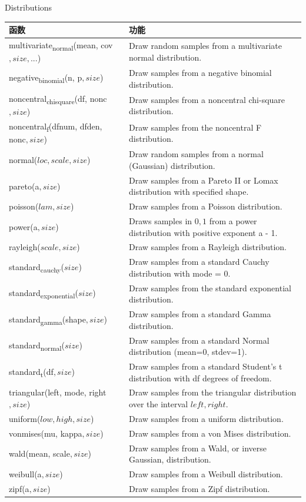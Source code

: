 \documentclass[ignorenonframetext,11pt,xcolor=dvipsnames,hyperref={colorlinks,allcolors=.,urlcolor=blue, citecolor=violet, bookmarksdepth=4},aspectratio=1610]{beamer}
\begin{document}
\begin{frame}{Distributions}
\protect\hypertarget{distributions}{}

\scriptsize

\begin{longtable}[]{@{}ll@{}}
\toprule
函数 & 功能\tabularnewline
\midrule
\endhead
multivariate\textsubscript{normal}(mean, cov\(, size, ...\)) & Draw
random samples from a multivariate normal distribution.\tabularnewline
negative\textsubscript{binomial}(n, p\(, size\)) & Draw samples from a
negative binomial distribution.\tabularnewline
noncentral\textsubscript{chisquare}(df, nonc\(, size\)) & Draw samples
from a noncentral chi-square distribution.\tabularnewline
noncentral\textsubscript{f}(dfnum, dfden, nonc\(, size\)) & Draw samples
from the noncentral F distribution.\tabularnewline
normal(\(loc, scale, size\)) & Draw random samples from a normal
(Gaussian) distribution.\tabularnewline
pareto(a\(, size\)) & Draw samples from a Pareto II or Lomax
distribution with specified shape.\tabularnewline
poisson(\(lam, size\)) & Draw samples from a Poisson
distribution.\tabularnewline
power(a\(, size\)) & Draws samples in \(0, 1\) from a power distribution
with positive exponent a - 1.\tabularnewline
rayleigh(\(scale, size\)) & Draw samples from a Rayleigh
distribution.\tabularnewline
standard\textsubscript{cauchy}(\(size\)) & Draw samples from a standard
Cauchy distribution with mode = 0.\tabularnewline
standard\textsubscript{exponential}(\(size\)) & Draw samples from the
standard exponential distribution.\tabularnewline
standard\textsubscript{gamma}(shape\(, size\)) & Draw samples from a
standard Gamma distribution.\tabularnewline
standard\textsubscript{normal}(\(size\)) & Draw samples from a standard
Normal distribution (mean=0, stdev=1).\tabularnewline
standard\textsubscript{t}(df\(, size\)) & Draw samples from a standard
Student's t distribution with df degrees of freedom.\tabularnewline
triangular(left, mode, right\(, size\)) & Draw samples from the
triangular distribution over the interval
\(left, right\).\tabularnewline
uniform(\(low, high, size\)) & Draw samples from a uniform
distribution.\tabularnewline
vonmises(mu, kappa\(, size\)) & Draw samples from a von Mises
distribution.\tabularnewline
wald(mean, scale\(, size\)) & Draw samples from a Wald, or inverse
Gaussian, distribution.\tabularnewline
weibull(a\(, size\)) & Draw samples from a Weibull
distribution.\tabularnewline
zipf(a\(, size\)) & Draw samples from a Zipf
distribution.\tabularnewline
\bottomrule
\end{longtable}

\end{frame}
\end{document}
